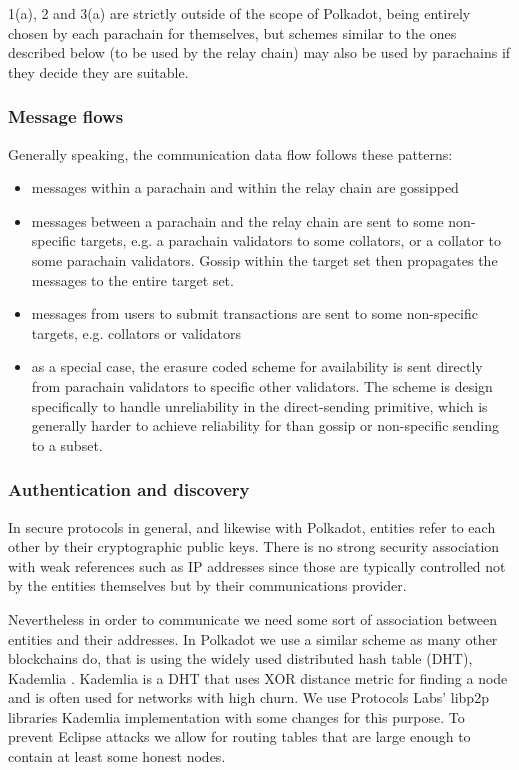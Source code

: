1(a), 2 and 3(a) are strictly outside of the scope of Polkadot, being entirely chosen by each parachain for themselves, but schemes similar to the ones described below (to be used by the relay chain) may also be used by parachains if they decide they are suitable.

\subsubsection{Message flows}

Generally speaking, the communication data flow follows these patterns:

\begin{itemize}
\item messages within a parachain and within the relay chain are gossipped
\item messages between a parachain and the relay chain are sent to some non-specific targets, e.g. a parachain validators to some collators, or a collator to some parachain validators. Gossip within the target set then propagates the messages to the entire target set.
\item messages from users to submit transactions are sent to some non-specific targets, e.g. collators or validators
\item as a special case, the erasure coded scheme for availability is sent directly from parachain validators to specific other validators. The scheme is design specifically to handle unreliability in the direct-sending primitive, which is generally harder to achieve reliability for than gossip or non-specific sending to a subset.
\end{itemize}

\subsubsection{Authentication and discovery} \label{sec:auth_discovery}

In secure protocols in general, and likewise with Polkadot, entities refer to each other by their cryptographic public keys. There is no strong security association with weak references such as IP addresses since those are typically controlled not by the entities themselves but by their communications provider.

Nevertheless in order to communicate we need some sort of association between entities and their addresses. In Polkadot we use a similar scheme as many other blockchains do, that is using the widely used distributed hash table (DHT), Kademlia \cite{Maymounkov:2002:Kademila}. Kademlia is a DHT that uses XOR distance metric for finding a node and is often used for networks with high churn. We use Protocols Labs' libp2p libraries  Kademlia implementation with some changes for this purpose. To prevent Eclipse attacks  we allow for routing tables that are large enough to contain at least some honest nodes.

